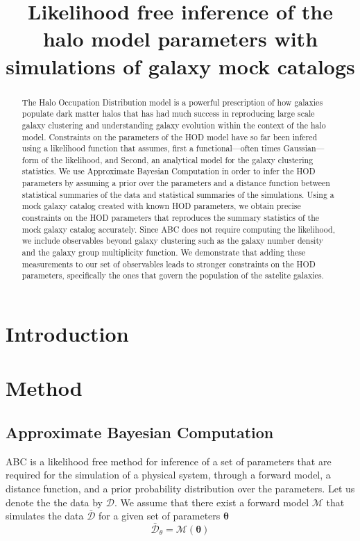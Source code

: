 \documentclass[12pt, preprint]{aastex}
\newcommand{\beq}{\begin{equation}}
\newcommand{\eeq}{\end{equation}}
\begin{document}
\title{Likelihood free inference of the halo model parameters with simulations of galaxy mock catalogs}

\begin{abstract}

The Halo Occupation Distribution model is a powerful prescription of how galaxies populate 
dark matter halos that has had much success in reproducing large scale galaxy clustering and understanding
galaxy evolution within the context of the halo model. Constraints on the parameters of the HOD model have 
so far been infered using a likelihood function that assumes, first a functional---often times Gaussian---form of the likelihood, 
and Second, an analytical model for the galaxy clustering statistics. We use Approximate Bayesian Computation 
in order to infer the HOD parameters by assuming a prior over the parameters and a distance function between 
statistical summaries of the data and statistical summaries of the simulations.
Using a mock galaxy catalog created with known HOD parameters, we obtain precise constraints on the HOD parameters that 
reproduces the summary statistics of the mock galaxy catalog accurately. 
Since ABC does not require computing the likelihood, we include observables beyond galaxy clustering such as 
the galaxy number density and the galaxy group multiplicity function. 
We demonstrate that adding these measurements to our set of observables leads to stronger constraints on the HOD parameters, 
specifically the ones that govern the population of the satelite galaxies.

\end{abstract}

\section{Introduction}

\section{Method}

\subsection{Approximate Bayesian Computation}

ABC is a likelihood free method for inference of a set of parameters that are required for the simulation of a 
physical system, through a forward model, a distance function, and a prior probability distribution over the parameters. 
Let us denote the the data by $\mathcal{D}$. We assume that there exist a forward model $\mathcal{M}$ that 
simulates the data $\bar{\mathcal{D}}$ for a given set of parameters $\bm{\theta}$
\beq
\bar{\mathcal{D}}_{\theta} = \mathcal{M}(\bm{\theta})
\eeq
\end{document}
